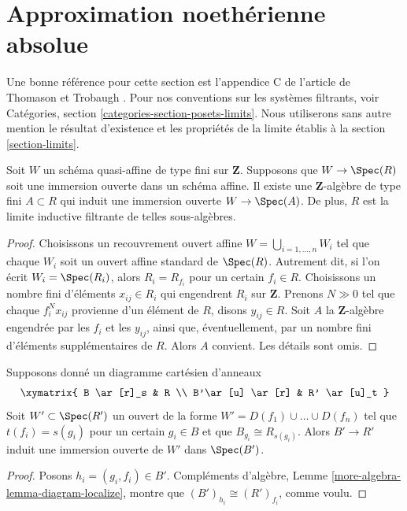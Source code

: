 \section{Approximation noethérienne absolue}
\label{section-approximation}

\noindent
Une bonne référence pour cette section est l'appendice C de l'article de
Thomason et Trobaugh \cite{TT}. Pour nos conventions sur les systèmes
filtrants, voir Catégories, section \ref{categories-section-posets-limits}.
Nous utiliserons sans autre mention le résultat d'existence et les propriétés
de la limite établis à la section \ref{section-limits}.

\begin{lemma}
\label{lemma-quasi-affine-finite-type-over-Z}
Soit $W$ un schéma quasi-affine de type fini sur $\mathbf{Z}$. Supposons que
$W \to \Spec(R)$ soit une immersion ouverte dans un schéma affine. Il existe
une $\mathbf{Z}$-algèbre de type fini $A \subset R$ qui induit une immersion
ouverte $W \to \Spec(A)$. De plus, $R$ est la limite inductive filtrante de
telles sous-algèbres.
\end{lemma}

\begin{proof}
Choisissons un recouvrement ouvert affine
$W = \bigcup_{i = 1, \ldots, n} W_i$ tel que chaque $W_i$ soit un ouvert
affine standard de $\Spec(R)$. Autrement dit, si l'on écrit
$W_i = \Spec(R_i)$, alors $R_i = R_{f_i}$ pour un certain $f_i \in R$.
Choisissons un nombre fini d'éléments $x_{ij} \in R_i$ qui engendrent $R_i$
sur $\mathbf{Z}$. Prenons $N \gg 0$ tel que chaque $f_i^Nx_{ij}$ provienne
d'un élément de $R$, disons $y_{ij} \in R$. Soit $A$ la
$\mathbf{Z}$-algèbre engendrée par les $f_i$ et les $y_{ij}$, ainsi que,
éventuellement, par un nombre fini d'éléments supplémentaires de $R$.
Alors $A$ convient. Les détails sont omis.
\end{proof}

\begin{lemma}
\label{lemma-diagram}
Supposons donné un diagramme cartésien d'anneaux
$$
\xymatrix{
B \ar[r]_s & R \\
B'\ar[u] \ar[r] & R' \ar[u]_t
}
$$
Soit $W' \subset \Spec(R')$ un ouvert de la forme
$W' = D(f_1) \cup \ldots \cup D(f_n)$ tel que $t(f_i) = s(g_i)$ pour un
certain $g_i \in B$ et que $B_{g_i} \cong R_{s(g_i)}$. Alors $B' \to R'$
induit une immersion ouverte de $W'$ dans $\Spec(B')$.
\end{lemma}

\begin{proof}
Posons $h_i = (g_i, f_i) \in B'$. Compléments d'algèbre,
Lemme \ref{more-algebra-lemma-diagram-localize}, montre que
$(B')_{h_i} \cong (R')_{f_i}$, comme voulu.
\end{proof}

